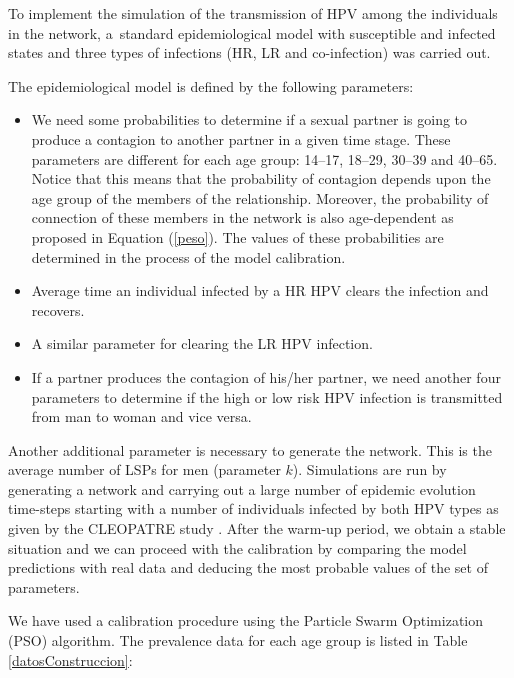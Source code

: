 
To implement the simulation of the transmission of HPV among the individuals in the network, a~standard epidemiological model with susceptible and infected states and three types of infections (HR, LR and co-infection) was carried out.

The epidemiological model is defined by the following parameters:

\begin{itemize}[leftmargin=*,labelsep=5mm]
	\item We need some probabilities to determine if a sexual partner is going to produce a contagion to another partner in a given time stage. These parameters are different for each age group:	
	14--17, 18--29, 30--39 and 40--65. Notice that this means that the probability of contagion depends upon the age group of the members of the relationship. Moreover, the probability of connection of these members in the network is also age-dependent
	as proposed in Equation (\ref{peso}). The values of these probabilities are determined in the process of the model calibration.
	
	\item Average time an individual infected by a HR HPV clears the infection and recovers.
	\item A similar parameter for clearing the LR HPV infection.
	\item If a partner produces the contagion of his/her partner, we need another four parameters to determine if the high or low risk HPV infection is transmitted from man to woman and vice versa. 
\end{itemize}

Another additional parameter is necessary to generate the network. This is the average number of LSPs for men (parameter $k$). Simulations are run by generating a network and carrying out a large number of epidemic evolution time-steps starting with a number of individuals infected by both HPV types as given by the CLEOPATRE study \cite{castellsague2012prevalence}.
After the warm-up period, we obtain a stable situation and we can proceed with the calibration by comparing the model predictions with real data and deducing the most probable values of the set of parameters.

We have used a calibration procedure using the Particle Swarm Optimization (PSO) algorithm. The prevalence data for each age group is listed in Table \ref{datosConstruccion}:

